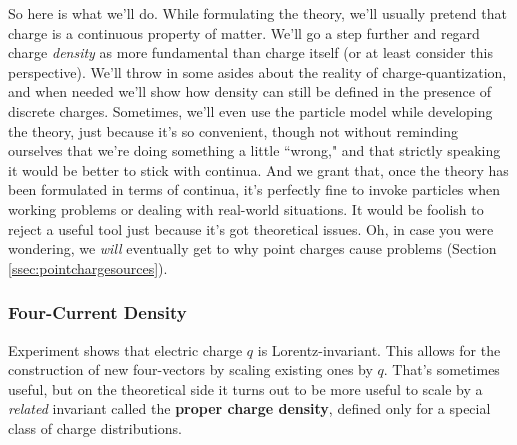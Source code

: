 \documentclass[12pt]{article}
\begin{document}
So here is what we'll do. While formulating the theory, we'll usually pretend that charge is a continuous property of matter. We'll go a step further and regard charge \emph{density} as more fundamental than charge itself (or at least consider this perspective). We'll throw in some asides about the reality of charge-quantization, and when needed we'll show how density can still be defined in the presence of discrete charges. Sometimes, we'll even use the particle model while developing the theory, just because it's so convenient, though not without reminding ourselves that we're doing something a little ``wrong," and that strictly speaking it would be better to stick with continua. And we grant that, once the theory has been formulated in terms of continua, it's perfectly fine to invoke particles when working problems or dealing with real-world situations. It would be foolish to reject a useful tool just because it's got theoretical issues. Oh, in case you were wondering, we \emph{will} eventually get to why point charges cause problems (Section \ref{ssec:pointchargesources}).

\subsubsection{Four-Current Density}\label{sssec:fcd}

Experiment shows that electric charge $q$ is Lorentz-invariant. This allows for the construction of new four-vectors by scaling existing ones by $q$. That's sometimes useful, but on the theoretical side it turns out to be more useful to scale by a \emph{related} invariant called the \textbf{proper charge density}, defined only for a special class of charge distributions.
\end{document}
